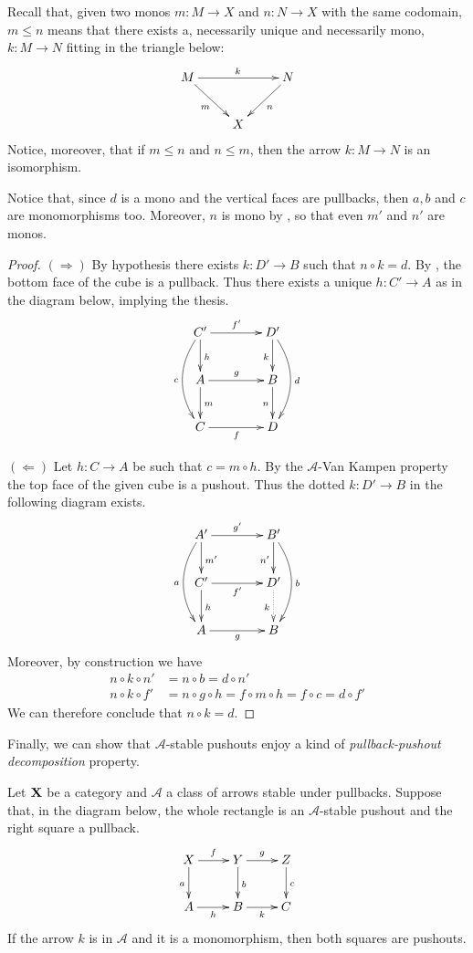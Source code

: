 \documentclass[a4paper,UKenglish,cleveref,pdftex, thm-restate,numberwithinsect]{lipics}
\def\X{\textbf {\textup{X}}}
\begin{document}
\begin{remark}
	Recall that, given two monos $m:M\to X$ and $n:N\to X$ with the same codomain, $m\leq n$ means that there exists a, necessarily unique and necessarily mono, $k:M\to N$ fitting in the triangle below:
	\[\xymatrix{M\ar[rr]^{k}  \ar[dr]_{m}&& N \ar[dl]^{n}\\ & X}\]
	Notice, moreover, that  if $m\leq n$ and $n\leq m$, then the arrow $k:M\to N$ is an isomorphism.  
\end{remark}

\begin{remark}
	Notice that, since $d$ is a mono and the vertical faces are pullbacks, then $a, b$ and $c$ are monomorphisms too. Moreover, $n$ is mono by , so that even $m'$ and $n'$ are monos.
\end{remark}

\begin{proof}		
	$(\Rightarrow)$ By hypothesis there exists $k:D'\to B$ such that $n\circ k = d$. By , the bottom face of the cube is a pullback. Thus there exists a unique $h:C'\to A$ as in the diagram below, implying the thesis.
	\[\xymatrix@C=40pt{C'  \ar[d]^{h}\ar[r]^{f'} \ar@/_.5cm/[dd]_{c}& D' \ar@/^.5cm/[dd]^{d}\ar[d]_{k}\\ A \ar[d]^{m} \ar[r]^{g} & B \ar[d]_{n} \\  C \ar[r]_f & D}\]
	
	\smallskip \noindent 
	$(\Leftarrow)$ Let $h:C\to A$ be such that $c=m\circ h$. By the $\mathcal{A}$-Van Kampen property the top face of the given cube is a pushout. Thus the dotted $k:D'\to B$ in the following diagram exists.
	\[\xymatrix@C=40pt{A' \ar@/_.5cm/[dd]_{a} \ar[d]^{m'} \ar[r]^{g'} & B' \ar[d]_{n'} \ar@/^.5cm/[dd]^{b} \\  C' \ar[d]^{h} \ar[r]_{f'} & D' \ar@{.>}[d]_{k}\\ A \ar[r]_g& B }\]
	Moreover, by construction we have
	\begin{align*}
		n\circ k \circ n'&= n\circ b=d\circ n'\\
		n\circ k \circ f' &= n\circ g\circ h=f\circ m\circ h=f\circ c= d\circ f' 
	\end{align*}
	We can therefore conclude that $n\circ k =d$.
\end{proof}

Finally, we can show that $\mathcal{A}$-stable pushouts enjoy a kind of \emph{pullback-pushout decomposition} property.

\begin{proposition}\label{prop:stab}Let $\X$ be a category and $\mathcal{A}$ a class of arrows stable under pullbacks. Suppose that, in the diagram below, the whole rectangle is an $\mathcal{A}$-stable pushout and the right square a pullback.
	\[\xymatrix{X \ar[d]_{a} \ar[r]^{f}& \ar[r]^{g} Y \ar[d]^{b}& Z \ar[d]^{c}\\ A \ar[r]_{h}& B \ar[r]_{k}& C}\]
	If the arrow $k$ is in $\mathcal{A}$ and it is a monomorphism,  then both squares are pushouts.
\end{proposition}
\end{document}
